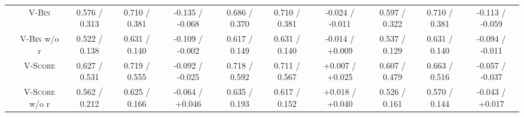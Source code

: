 \begin{table}[!t]
\begin{tabular}{@{}c|c|ccc|ccc|ccc@{}}
        \cmidrule{2-11}
                    & \textsc{V-Bin}           & 0.576 / 0.313    & 0.710 / 0.381    & -0.135 / -0.068                              & 0.686 / 0.370    & 0.710 / 0.381    & -0.024 / -0.011                              & 0.597 / 0.322    & 0.710 / 0.381    & -0.113 / -0.059                              \\
                    & \textsc{V-Bin} w/o r     & 0.522 / 0.138    & 0.631 / 0.140    & -0.109 / -0.002                              & 0.617 / 0.149    & 0.631 / 0.140    & -0.014 / +0.009                              & 0.537 / 0.129    & 0.631 / 0.140    & -0.094 / -0.011                              \\
                    & \textsc{V-Score}         & 0.627 / 0.531    & 0.719 / 0.555    & -0.092 / -0.025                              & 0.718 / 0.592    & 0.711 / 0.567    & +0.007 / +0.025                              & 0.607 / 0.479    & 0.663 / 0.516    & -0.057 / -0.037                              \\
                    & \textsc{V-Score} w/o r   & 0.562 / 0.212    & 0.625 / 0.166    & -0.064 / +0.046                              & 0.635 / 0.193    & 0.617 / 0.152    & +0.018 / +0.040                              & 0.526 / 0.161    & 0.570 / 0.144    & -0.043 / +0.017                              \\
        \bottomrule
    \end{tabular}
\end{table}